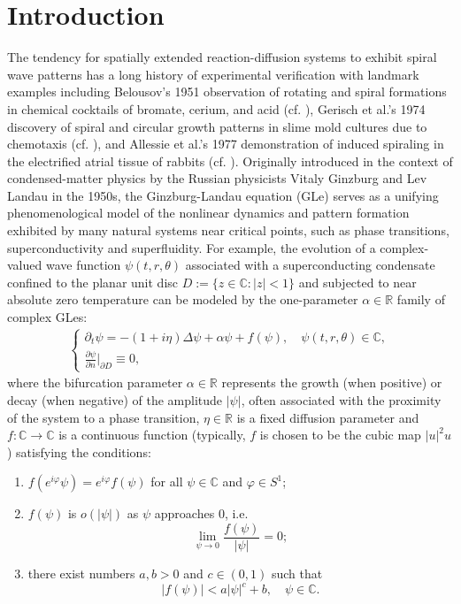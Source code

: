 \documentclass[11pt]{amsart}
\def\bc{{\mathbb{C}}}
\def\br{{\mathbb{R}}}
\def\br{\mathbb R}
\begin{document}
\section{Introduction} \label{sec:introduction}
The tendency for spatially extended reaction-diffusion systems to exhibit spiral wave patterns has a long history of experimental verification with landmark examples including Belousov's 1951 observation of rotating and spiral formations in chemical cocktails of bromate, cerium, and acid (cf. \cite{Belousov}), Gerisch et al.'s 1974 discovery of spiral and circular growth patterns in slime mold cultures due to chemotaxis (cf. \cite{Gerisch}), and Allessie et al.'s 1977 demonstration of induced spiraling in the electrified atrial tissue of rabbits (cf. \cite{Allessie}). 
Originally introduced in the context of condensed-matter physics by the Russian physicists Vitaly Ginzburg and Lev Landau in the 1950s, the Ginzburg-Landau equation (GLe) serves as a unifying
phenomenological model of the nonlinear dynamics and pattern formation exhibited by many natural systems near critical points, such as phase transitions, superconductivity and superfluidity. For example, the evolution of a complex-valued wave function $\psi(t,r,\theta)$ associated with a superconducting condensate confined to the planar unit disc $D:= \{ z \in \bc : |z | < 1 \}$ and subjected to near absolute zero temperature can be modeled by the one-parameter $\alpha \in \br$ family of complex GLes:
\begin{align} \label{eq:system_GL}
\begin{cases}
\partial_t \psi = -(1+i \eta) \Delta \psi +  \alpha \psi + f(\psi), \quad \psi(t,r,\theta) \in \bc,  \\
\frac{\partial \psi}{\partial n}|_{\partial D} \equiv 0,
\end{cases}
\end{align}
where the bifurcation parameter $\alpha \in \br$ represents the growth (when positive) or decay (when negative) of the amplitude $|\psi|$, often associated with the proximity of the system to a phase transition, $\eta \in \br$ is a fixed diffusion parameter and $f:\bc \rightarrow \bc$ is a continuous function (typically, $f$ is chosen to be the cubic map $|u|^2u$) satisfying the conditions:
\begin{enumerate}[label=($A_\arabic*$)]
\item\label{a1} $f(e^{i \varphi} \psi) = e^{i \varphi} f(\psi)$ for all $\psi \in \bc$ and $\varphi \in S^1$; 
\item\label{a2} $f(\psi)$ is $o(|\psi|)$ as $\psi$ approaches $0$, i.e.
\[
    \lim_{\psi \rightarrow 0} \frac{f(\psi)}{|\psi|} = 0;
\]
\item\label{a3} there exist numbers $a,b >0$ and $c \in (0,1)$ such that
\[
|f(\psi)| < a|\psi|^c + b, \quad \psi \in \bc.
\]
\end{enumerate}
\end{document}

